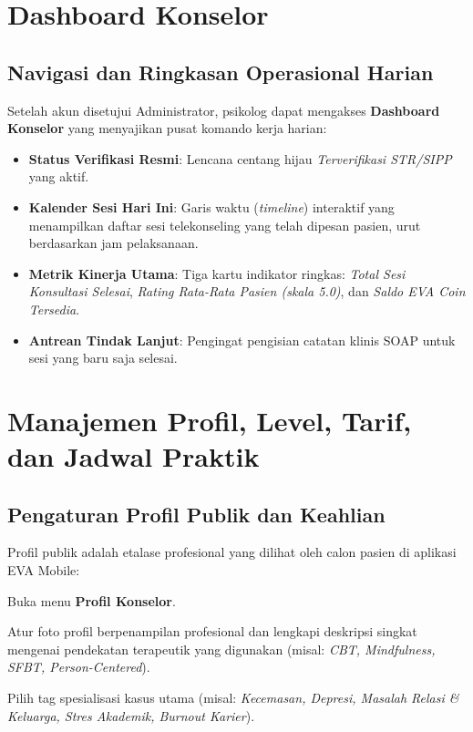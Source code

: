 
\section{Dashboard Konselor}

\subsection{Navigasi dan Ringkasan Operasional Harian}
Setelah akun disetujui Administrator, psikolog dapat mengakses \textbf{Dashboard Konselor} yang menyajikan pusat komando kerja harian:
\begin{itemize}[leftmargin=1.4em]
  \item \textbf{Status Verifikasi Resmi}: Lencana centang hijau \textit{Terverifikasi STR/SIPP} yang aktif.
  \item \textbf{Kalender Sesi Hari Ini}: Garis waktu (\textit{timeline}) interaktif yang menampilkan daftar sesi telekonseling yang telah dipesan pasien, urut berdasarkan jam pelaksanaan.
  \item \textbf{Metrik Kinerja Utama}: Tiga kartu indikator ringkas: \textit{Total Sesi Konsultasi Selesai}, \textit{Rating Rata-Rata Pasien (skala 5.0)}, dan \textit{Saldo EVA Coin Tersedia}.
  \item \textbf{Antrean Tindak Lanjut}: Pengingat pengisian catatan klinis SOAP untuk sesi yang baru saja selesai.
\end{itemize}


\section{Manajemen Profil, Level, Tarif, dan Jadwal Praktik}

\subsection{Pengaturan Profil Publik dan Keahlian}
Profil publik adalah etalase profesional yang dilihat oleh calon pasien di aplikasi EVA Mobile:
\begin{steplist}
  \item Buka menu \textbf{Profil Konselor}.
  \item Atur foto profil berpenampilan profesional dan lengkapi deskripsi singkat mengenai pendekatan terapeutik yang digunakan (misal: \textit{CBT, Mindfulness, SFBT, Person-Centered}).
  \item Pilih tag spesialisasi kasus utama (misal: \textit{Kecemasan, Depresi, Masalah Relasi \& Keluarga, Stres Akademik, Burnout Karier}).
\end{steplist}

